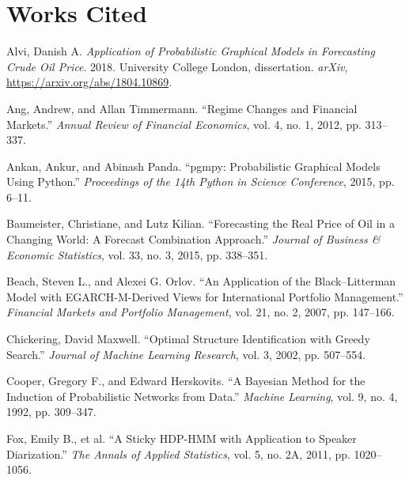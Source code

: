 \documentclass[11pt,a4paper]{article}
\begin{document}
\newpage
\section*{Works Cited}

\noindent
Alvi, Danish A. \textit{Application of Probabilistic Graphical Models in Forecasting Crude Oil
Price}. 2018. University College London, dissertation. \textit{arXiv},
\url{https://arxiv.org/abs/1804.10869}.

\vspace{0.6em}\noindent
Ang, Andrew, and Allan Timmermann. ``Regime Changes and Financial Markets.'' \textit{Annual Review
of Financial Economics}, vol. 4, no. 1, 2012, pp. 313--337.

\vspace{0.6em}\noindent
Ankan, Ankur, and Abinash Panda. ``pgmpy: Probabilistic Graphical Models Using Python.''
\textit{Proceedings of the 14th Python in Science Conference}, 2015, pp. 6--11.

\vspace{0.6em}\noindent
Baumeister, Christiane, and Lutz Kilian. ``Forecasting the Real Price of Oil in a Changing World: A
Forecast Combination Approach.'' \textit{Journal of Business \& Economic Statistics}, vol. 33,
no. 3, 2015, pp. 338--351.

\vspace{0.6em}\noindent
Beach, Steven L., and Alexei G. Orlov. ``An Application of the Black--Litterman Model with
EGARCH-M-Derived Views for International Portfolio Management.'' \textit{Financial Markets and
Portfolio Management}, vol. 21, no. 2, 2007, pp. 147--166.

\vspace{0.6em}\noindent
Chickering, David Maxwell. ``Optimal Structure Identification with Greedy Search.'' \textit{Journal
of Machine Learning Research}, vol. 3, 2002, pp. 507--554.

\vspace{0.6em}\noindent
Cooper, Gregory F., and Edward Herskovits. ``A Bayesian Method for the Induction of Probabilistic
Networks from Data.'' \textit{Machine Learning}, vol. 9, no. 4, 1992, pp. 309--347.

\vspace{0.6em}\noindent
Fox, Emily B., et al. ``A Sticky HDP-HMM with Application to Speaker Diarization.'' \textit{The
Annals of Applied Statistics}, vol. 5, no. 2A, 2011, pp. 1020--1056.
\end{document}
